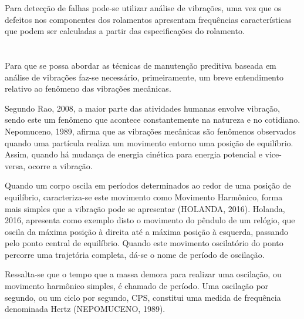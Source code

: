 \documentclass[
	12pt,				
	oneside,			
	a4paper,			
	english,			
	brazil,			
	]{abntex2ppgsi}
\begin{document}
Para detecção de falhas pode-se utilizar análise de vibrações, uma vez que os defeitos nos componentes dos rolamentos apresentam frequências características que podem ser calculadas a partir das especificações do rolamento. 

\newpage
\section{}

Para que se possa abordar as técnicas de manutenção preditiva baseada em análise de vibrações faz-se necessário, primeiramente, um breve entendimento relativo ao fenômeno das vibrações mecânicas. 

Segundo Rao, 2008, a maior parte das atividades humanas envolve vibração, sendo este um fenômeno que acontece constantemente na natureza e no cotidiano. Nepomuceno, 1989, afirma que as vibrações mecânicas são fenômenos observados quando uma partícula realiza um movimento entorno uma posição de equilíbrio. Assim, quando há mudança de energia cinética para energia potencial e vice-versa, ocorre a vibração. 

Quando um corpo oscila em períodos determinados ao redor de uma posição de equilíbrio, caracteriza-se este movimento como Movimento Harmônico, forma mais simples que a vibração pode se apresentar (HOLANDA, 2016). Holanda, 2016, apresenta como exemplo disto o movimento do pêndulo de um relógio, que oscila da máxima posição à direita até a máxima posição à esquerda, passando pelo ponto central de equilíbrio. Quando este movimento oscilatório do ponto percorre uma trajetória completa, dá-se o nome de período de oscilação.  

Ressalta-se que o tempo que a massa demora para realizar uma oscilação, ou movimento harmônico simples, é chamado de período. Uma oscilação por segundo, ou um ciclo por segundo, CPS, constitui uma medida de frequência denominada Hertz (NEPOMUCENO, 1989). 


\end{document}
